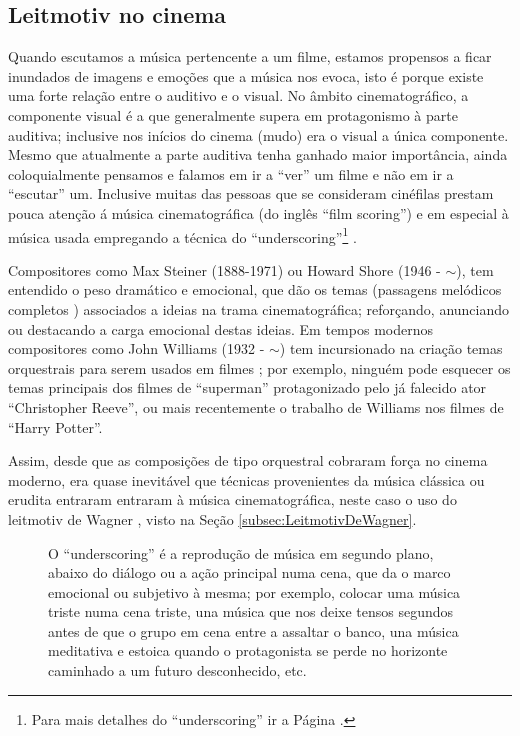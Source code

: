 \subsection{Leitmotiv no cinema}

Quando escutamos a música pertencente a um filme, 
estamos propensos a ficar inundados de imagens e emoções que a música nos evoca,
isto é porque existe uma forte relação entre o auditivo e o visual.
No âmbito cinematográfico, a componente visual é a que generalmente supera em protagonismo à parte auditiva;
inclusive nos inícios do cinema (mudo) era o visual a única componente.
Mesmo que atualmente a parte auditiva tenha ganhado maior importância,
ainda coloquialmente pensamos e falamos em ir a ``ver'' um filme e não em ir a ``escutar'' um.
Inclusive muitas das pessoas que se consideram cinéfilas prestam pouca atenção 
á música cinematográfica (do inglês ``film scoring'') 
e em especial à música usada empregando a técnica do ``underscoring''\footnote{Para 
mais detalhes do ``underscoring'' ir a Página \pageref{page:underscoring}. } \cite[pp. 255]{bribitzer2015understanding}.

Compositores como Max Steiner (1888-1971) \cite[pp. 194]{nasta2004perspective} 
ou  Howard Shore (1946 - $\sim$), tem entendido o peso dramático e emocional,
que dão os temas (passagens melódicos completos \cite[pp. 1496]{latham2008diccionario}) associados a ideias na trama cinematográfica;
reforçando, anunciando ou destacando a carga emocional destas ideias.
Em tempos modernos compositores como John Williams (1932 - $\sim$) tem
incursionado na criação temas orquestrais para serem usados em filmes \cite[pp. 255-256]{bribitzer2015understanding};
por exemplo, ninguém pode esquecer os temas principais dos filmes de ``superman'' protagonizado pelo já falecido ator ``Christopher Reeve'',
ou mais recentemente o trabalho de Williams nos filmes de ``Harry Potter''.

Assim, desde que as composições de tipo orquestral cobraram força no cinema moderno,
era quase inevitável que  técnicas provenientes da música clássica ou erudita entraram entraram à música cinematográfica,
neste caso o uso do leitmotiv de Wagner \cite[pp. 256]{bribitzer2015understanding}, visto na Seção \ref{subsec:LeitmotivDeWagner}.



\begin{figure}[t]
\begin{elaboracion}[title=Que é o ``underscoring''?]
O ``underscoring'' é a reprodução de música em segundo plano, abaixo do diálogo ou a ação principal numa cena,
que da o marco emocional ou subjetivo à mesma;
por exemplo, colocar uma música triste numa cena triste, 
una música que nos deixe tensos segundos antes de que o grupo em cena entre a assaltar o banco, 
una música meditativa e estoica quando o protagonista se perde no horizonte caminhado a um futuro desconhecido, etc.
\end{elaboracion}
\label{page:underscoring}
\end{figure}

